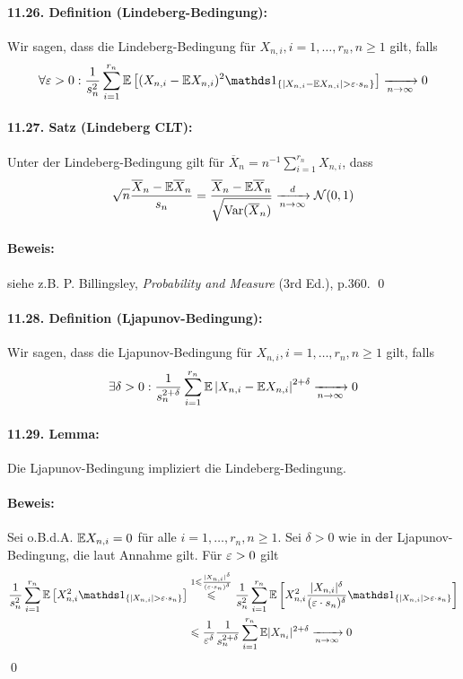  \paragraph{11.26. Definition (Lindeberg-Bedingung):}Wir sagen, dass die Lindeberg-Bedingung f\"ur $X_{n,i},i=1,\hdots,r_n,n\geq1$ gilt, falls
 $$\forall\eps>0:\dfrac{1}{s_n^2}\sum_{i=1}^{r_n}\E\left[(X_{n,i}-\E X_{n,i})^2\ind{\{|X_{n,i}-\E X_{n,i}|>\eps\cdot s_n\}}\right]\nto{}{n\to\infty}0$$
 
 \paragraph{11.27. Satz (Lindeberg CLT):}Unter der Lindeberg-Bedingung gilt f\"ur $\overline X_n=n^{-1}\sum_{i=1}^{r_n}X_{n,i}$, dass
 $$\sqrt{n}\dfrac{\overline X_n-\E\overline X_n}{s_n}=\dfrac{\overline X_n-\E\overline X_n}{\sqrt{\Var(\overline X_n)}}\nto{d}{n\to\infty}\mathcal{N}(0,1)$$
 
 \paragraph{Beweis:}siehe z.B. P. Billingsley, \textit{Probability and Measure} (3rd Ed.), p.360. \qed
 
 \paragraph{11.28. Definition (Ljapunov-Bedingung):}Wir sagen, dass die Ljapunov-Bedingung f\"ur $X_{n,i},i=1,\hdots,r_n,n\geq1$ gilt, falls
$$\exists\delta>0:\dfrac{1}{s_n^{2+\delta}}\sum_{i=1}^{r_n}\E\left|X_{n,i}-\E X_{n,i}\right|^{2+\delta}\nto{}{n\to\infty}0$$

\paragraph{11.29. Lemma:} Die Ljapunov-Bedingung impliziert die Lindeberg-Bedingung.

\paragraph{Beweis:}Sei o.B.d.A. $\mathbb{E} X_{n,i}=0$ f\"ur alle $i=1,\hdots,r_n,n\geq1$. Sei $\delta>0$ wie in der Ljapunov-Bedingung, die laut Annahme gilt. F\"ur $\varepsilon>0$ gilt
\begin{align*}
    \dfrac{1}{s_n^2}\sum_{i=1}^{r_n}\E\left[X_{n,i}^2\ind{\{|X_{n,i}|>\eps\cdot s_n\}}\right]&\overset{1\leq\frac{|X_{n,i}|^\delta}{(\eps\cdot s_n)^\delta}}{\leq}\dfrac{1}{s_n^2}\sum_{i=1}^{r_n}\E\left[X_{n,i}^2\dfrac{|X_{n,i}|^\delta}{(\eps\cdot s_n)^\delta}\ind{\{|X_{n,i}|>\eps\cdot s_n\}}\right]\\
    &\leq\dfrac{1}{\eps^\delta}\dfrac{1}{s_n^{2+\delta}}\sum_{i=1}^{r_n}\E|X_{n_i}|^{2+\delta}\nto{}{n\to\infty}0
\end{align*}
\qed
